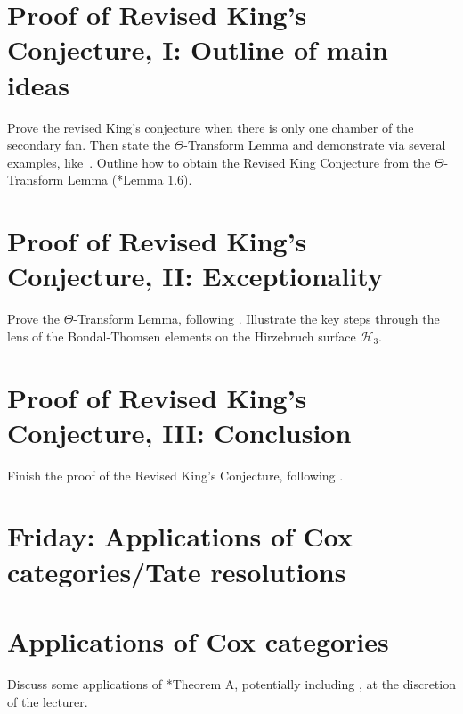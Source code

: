 \documentclass[11pt]{amsart}
\numberwithin{equation}{section}
\theoremstyle{definition}
\theoremstyle{remark}
\begin{document}
\section{Proof of Revised King's Conjecture, I:  Outline of main ideas}
Prove the revised King's conjecture when there is only one chamber of the secondary fan.
Then state the $\Theta$-Transform Lemma and demonstrate via several examples, like~\cite[\S4.2]{king}.  Outline how to obtain the Revised King Conjecture from the $\Theta$-Transform Lemma (\cite{king}*{Lemma 1.6}).

\section{Proof of Revised King's Conjecture, II: Exceptionality}
Prove the $\Theta$-Transform Lemma, following \cite[\S4.3]{king}.  Illustrate the key steps through the lens of the Bondal-Thomsen elements on the Hirzebruch surface $\mathcal H_3$.




\section{Proof of Revised King's Conjecture, III: Conclusion}
Finish the proof of the Revised King's Conjecture, following \cite[\S4.3 and \S5]{king}.


\section*{Friday: Applications of Cox categories/Tate resolutions}



\section{Applications of Cox categories}
Discuss some applications of \cite{king}*{Theorem A}, potentially including \cite[Proposition 1.3, Theorems 1.4, 1.5]{king}, at the discretion of the lecturer.
\end{document}
